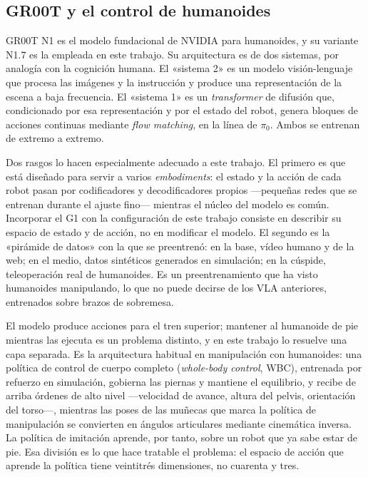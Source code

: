 \subsection{GR00T y el control de humanoides}

GR00T N1 \cite{nvidia2025gr00t} es el modelo fundacional de NVIDIA para humanoides, y su variante
N1.7 es la empleada en este trabajo. Su arquitectura es de dos sistemas, por analogía con la
cognición humana. El «sistema 2» es un modelo visión-lenguaje que procesa las imágenes y la
instrucción y produce una representación de la escena a baja frecuencia. El «sistema 1» es un
\textit{transformer} de difusión que, condicionado por esa representación y por el estado del robot,
genera bloques de acciones continuas mediante \textit{flow matching}, en la línea de $\pi_0$. Ambos
se entrenan de extremo a extremo.

Dos rasgos lo hacen especialmente adecuado a este trabajo. El primero es que está diseñado para
servir a varios \textit{embodiments}: el estado y la acción de cada robot pasan por codificadores y
decodificadores propios —pequeñas redes que se entrenan durante el ajuste fino— mientras el núcleo
del modelo es común. Incorporar el G1 con la configuración de este trabajo consiste en describir su
espacio de estado y de acción, no en modificar el modelo. El segundo es la «pirámide de datos» con
la que se preentrenó: en la base, vídeo humano y de la web; en el medio, datos sintéticos generados
en simulación; en la cúspide, teleoperación real de humanoides. Es un preentrenamiento que ha visto
humanoides manipulando, lo que no puede decirse de los VLA anteriores, entrenados sobre brazos de
sobremesa.

El modelo produce acciones para el tren superior; mantener al humanoide de pie mientras las ejecuta
es un problema distinto, y en este trabajo lo resuelve una capa separada. Es la arquitectura habitual
en manipulación con humanoides: una política de control de cuerpo completo (\textit{whole-body
control}, WBC), entrenada por refuerzo en simulación, gobierna las piernas y mantiene el equilibrio,
y recibe de arriba órdenes de alto nivel —velocidad de avance, altura del pelvis, orientación del
torso—, mientras las poses de las muñecas que marca la política de manipulación se convierten en
ángulos articulares mediante cinemática inversa. La política de imitación aprende, por tanto, sobre
un robot que ya sabe estar de pie. Esa división es lo que hace tratable el problema: el espacio de
acción que aprende la política tiene veintitrés dimensiones, no cuarenta y tres.

